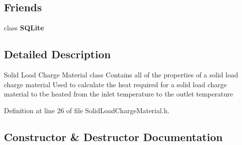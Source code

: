 \subsection*{Friends}
\begin{DoxyCompactItemize}
\item 
\mbox{\label{class_solid_load_charge_material_ac7d22f3ca36435f73d55df60dc799e14}} 
class {\bfseries S\+Q\+Lite}
\end{DoxyCompactItemize}


\subsection{Detailed Description}
Solid Load Charge Material class Contains all of the properties of a solid load charge material Used to calculate the heat required for a solid load charge material to tbe heated from the inlet temperature to the outlet temperature 

Definition at line 26 of file Solid\+Load\+Charge\+Material.\+h.



\subsection{Constructor \& Destructor Documentation}
\mbox{\label{class_solid_load_charge_material_a9145db5518b94cfc1919b8d6ff809f5e}} 
